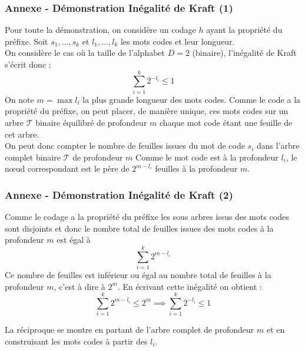 \documentclass[aspectratio=43]{beamer}
\begin{document}
\begin{frame}
    \frametitle{Annexe - Démonstration Inégalité de Kraft (1)}

    \small
    Pour toute la démonstration, on considère un codage $h$ ayant la propriété du préfixe. Soit $s_1, \dots , s_k$ et $l_1, \dots , l_k$ les mots codes et leur
    longueur. \\
    On considère le cas où la taille de l'alphabet $D = 2$ (binaire), l'inégalité de Kraft s'écrit donc :
    $$ \sum_{i = 1}^{k} 2^{-l_i} \leqslant 1$$
    On note $m = \max l_i$ la plus grande longueur des mots codes. Comme le code a la propriété du préfixe, on
    peut placer, de manière unique, ces mots codes sur un arbre $\mathcal{T}$ binaire équilibré de profondeur $m$ chaque mot code étant une feuille de cet arbre.
    \\
    On peut donc compter le nombre de feuilles issues du mot de code $s_i$ dans l'arbre complet binaire $\mathcal{T}$ de profondeur $m$
    Comme le mot code est à la profondeur $l_i$, le n\oe{ud} correspondant est le père de $2^{m - l_i}$ feuilles à la profondeur $m$. \\

\end{frame}

\begin{frame}
    \frametitle{Annexe - Démonstration Inégalité de Kraft (2)}

    \small
    Comme le codage a la propriété du préfixe les sous arbres issus des mots codes sont disjoints et donc le nombre
    total de feuilles issues des mots codes à la profondeur $m$ est égal à
    $$\sum_{i = 1}^{k} 2^{m-l_i}$$
    Ce nombre de feuilles est inférieur ou égal au nombre total de feuilles à la profondeur $m$, c’est à dire à $2^m$. En écrivant cette inégalité on obtient : 
    $$\sum_{i = 1}^{k} 2^{m-l_i} \leqslant 2^m \implies \sum_{i = 1}^{k} 2^{-l_i} \leqslant 1$$

    \vspace*{2em}

    La réciproque se montre en partant de l'arbre complet de profondeur $m$ et en construisant les mots codes à partir des $l_i$.

\end{frame}
\end{document}
